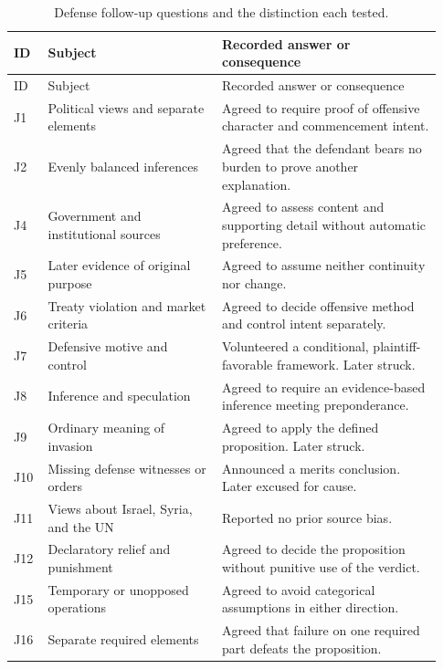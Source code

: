 \begin{longtable}{@{}L{0.07\linewidth}L{0.38\linewidth}L{0.48\linewidth}@{}}
\caption{Defense follow-up questions and the distinction each tested.}\\
\toprule ID & Subject & Recorded answer or consequence\\ \midrule
\endfirsthead
\toprule ID & Subject & Recorded answer or consequence\\ \midrule
\endhead
J1 & Political views and separate elements & Agreed to require proof of offensive character and commencement intent.\\
J2 & Evenly balanced inferences & Agreed that the defendant bears no burden to prove another explanation.\\
J4 & Government and institutional sources & Agreed to assess content and supporting detail without automatic preference.\\
J5 & Later evidence of original purpose & Agreed to assume neither continuity nor change.\\
J6 & Treaty violation and market criteria & Agreed to decide offensive method and control intent separately.\\
J7 & Defensive motive and control & Volunteered a conditional, plaintiff-favorable framework.  Later struck.\\
J8 & Inference and speculation & Agreed to require an evidence-based inference meeting preponderance.\\
J9 & Ordinary meaning of invasion & Agreed to apply the defined proposition.  Later struck.\\
J10 & Missing defense witnesses or orders & Announced a merits conclusion.  Later excused for cause.\\
J11 & Views about Israel, Syria, and the UN & Reported no prior source bias.\\
J12 & Declaratory relief and punishment & Agreed to decide the proposition without punitive use of the verdict.\\
J15 & Temporary or unopposed operations & Agreed to avoid categorical assumptions in either direction.\\
J16 & Separate required elements & Agreed that failure on one required part defeats the proposition.\\
\bottomrule
\end{longtable}

